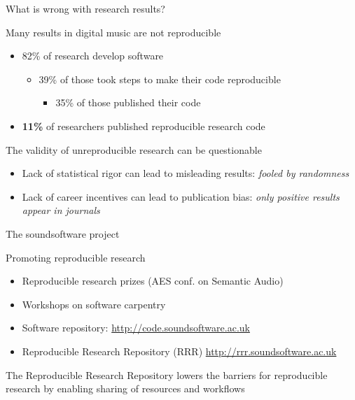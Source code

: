 \documentclass[10pt]{beamer}
\begin{document}
\begin{frame}{What is wrong with research results?}
\begin{block}{Many results in digital music are not reproducible}
\begin{itemize}
\item 82\% of research develop software
\begin{itemize}
\item 39\% of those took steps to make their code reproducible
\begin{itemize}
\item 35\% of those published their code
\end{itemize}
\end{itemize}
\item \textbf{11\%} of researchers published reproducible research code
\end{itemize}
\end{block}
\begin{block}{The validity of unreproducible research can be questionable}
\begin{itemize}
\item Lack of statistical rigor can lead to misleading results: \emph{fooled by randomness}
\item Lack of career incentives can lead to publication bias: \emph{only positive results appear in journals}
\end{itemize}
\end{block}
\end{frame}

\begin{frame}{The soundsoftware project}
\begin{block}{Promoting reproducible research}
\begin{itemize}
\item Reproducible research prizes (AES conf. on Semantic Audio)
\item Workshops on software carpentry
\item Software repository: \url{http://code.soundsoftware.ac.uk}
\item Reproducible Research Repository (RRR) \url{http://rrr.soundsoftware.ac.uk}
\end{itemize}
\end{block}

The Reproducible Research Repository lowers the barriers for reproducible research by enabling sharing of resources and workflows
\end{frame}
\end{document}
